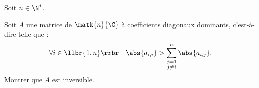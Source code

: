 Soit $n\in\N^\ast$.

Soit $A$ une matrice de $\matk{n}{\C}$ à coefficients diagonaux
  dominants, c'est-à-dire telle que :
  \[\forall i\in\llbr{1,n}\rrbr \quad \abs{a_{i,i}} >
    \sum_{\substack{j=1\\ j\not=i}}^n \abs{a_{i,j}}.\]
  Montrer que $A$ est inversible.
